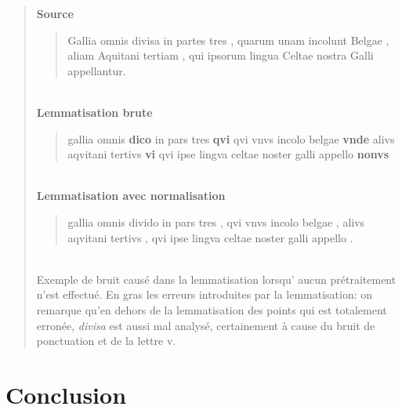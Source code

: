 \begin{quote}
    \textbf{Source}\\
    \blockquote{Gallia omnis divisa in partes tres , quarum unam incolunt Belgae , aliam Aquitani tertiam , qui ipsorum lingua Celtae nostra Galli appellantur.}\\
    \textbf{Lemmatisation brute}\\
    \blockquote{gallia omnis \textbf{dico} in pars tres \textbf{qvi} qvi vnvs incolo belgae \textbf{vnde} alivs aqvitani tertivs \textbf{vi} qvi ipse lingva celtae noster galli appello \textbf{nonvs}}\\
    \textbf{Lemmatisation avec normalisation}\\
    \blockquote{gallia omnis divido in pars tres , qvi vnvs incolo belgae , alivs aqvitani tertivs , qvi ipse lingva celtae noster galli appello .}\\
    
    Exemple de bruit causé dans la lemmatisation lorsqu’ aucun prétraitement n'est effectué. En gras les erreurs introduites par la lemmatisation: on remarque qu'en dehors de la lemmatisation des points qui est totalement erronée, \textit{divisa} est aussi mal analysé, certainement à cause du bruit de ponctuation et de la lettre v.
    \label{quote:lemmatisation:gallia-errors}
\end{quote}


 

\section*{Conclusion}

